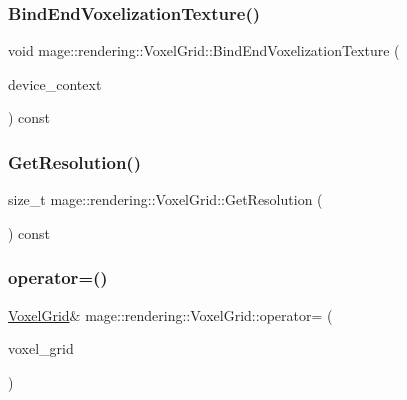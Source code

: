 \subsubsection{\texorpdfstring{Bind\+End\+Voxelization\+Texture()}{BindEndVoxelizationTexture()}}
{\footnotesize\ttfamily void mage\+::rendering\+::\+Voxel\+Grid\+::\+Bind\+End\+Voxelization\+Texture (\begin{DoxyParamCaption}\item[{I\+D3\+D11\+Device\+Context \&}]{device\+\_\+context }\end{DoxyParamCaption}) const\hspace{0.3cm}{\ttfamily [noexcept]}}

\hypertarget{classmage_1_1rendering_1_1_voxel_grid_ab38b97d6f567f2f44fa000a6bb9f305c}{}\label{classmage_1_1rendering_1_1_voxel_grid_ab38b97d6f567f2f44fa000a6bb9f305c} 
\subsubsection{\texorpdfstring{Get\+Resolution()}{GetResolution()}}
{\footnotesize\ttfamily size\+\_\+t mage\+::rendering\+::\+Voxel\+Grid\+::\+Get\+Resolution (\begin{DoxyParamCaption}{ }\end{DoxyParamCaption}) const\hspace{0.3cm}{\ttfamily [noexcept]}}

\hypertarget{classmage_1_1rendering_1_1_voxel_grid_a90b94d3a00e365e1a03d1077a5c79a11}{}\label{classmage_1_1rendering_1_1_voxel_grid_a90b94d3a00e365e1a03d1077a5c79a11} 
\subsubsection{\texorpdfstring{operator=()}{operator=()}\hspace{0.1cm}{\footnotesize\ttfamily [1/2]}}
{\footnotesize\ttfamily \hyperlink{classmage_1_1rendering_1_1_voxel_grid}{Voxel\+Grid}\& mage\+::rendering\+::\+Voxel\+Grid\+::operator= (\begin{DoxyParamCaption}\item[{const \hyperlink{classmage_1_1rendering_1_1_voxel_grid}{Voxel\+Grid} \&}]{voxel\+\_\+grid }\end{DoxyParamCaption})\hspace{0.3cm}{\ttfamily [delete]}}

